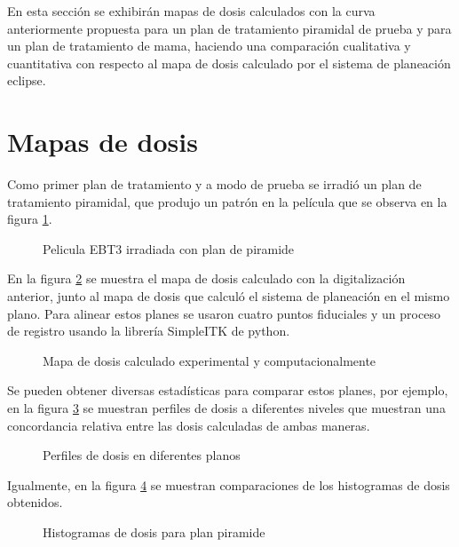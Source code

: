 En esta sección se exhibirán mapas de dosis calculados con la curva anteriormente propuesta para un plan de tratamiento piramidal de prueba y para un plan de tratamiento de mama, haciendo una comparación cualitativa y cuantitativa con respecto al mapa de dosis calculado por el sistema de planeación eclipse.
\section{Mapas de dosis}
Como primer plan de tratamiento y a modo de prueba se irradió un plan de tratamiento piramidal, que produjo un patrón en la película que se observa en la figura \ref{fig:piramideEscaneada}.\\
\begin{figure}
	\centering
	
	\caption{Pelicula EBT3 irradiada con plan de piramide }
	\label{fig:piramideEscaneada}
\end{figure}

En la figura \ref{fig:mapaPiramide} se muestra el mapa de dosis calculado con la digitalización anterior, junto al mapa de dosis que calculó el sistema de planeación en el mismo plano. Para alinear estos planes se usaron cuatro puntos fiduciales y un proceso de registro usando la librería SimpleITK de python.\\

\begin{figure}
	\centering
	
	\caption{Mapa de dosis calculado experimental y computacionalmente }
	\label{fig:mapaPiramide}
\end{figure}

Se pueden obtener diversas estadísticas para comparar estos planes, por ejemplo, en la figura \ref{fig:perfilesDosisPiramide} se muestran perfiles de dosis a diferentes niveles que muestran una concordancia relativa entre las dosis calculadas de ambas maneras.\\
\begin{figure}
	\centering
	
	\caption{Perfiles de dosis en diferentes planos }
	\label{fig:perfilesDosisPiramide}
\end{figure}
Igualmente, en la figura \ref{fig:histogramasDosisPiramide} se muestran comparaciones de los histogramas de dosis obtenidos.\\
\begin{figure}
	\centering
	
	\caption{Histogramas de dosis para plan piramide }
	\label{fig:histogramasDosisPiramide}
\end{figure}

